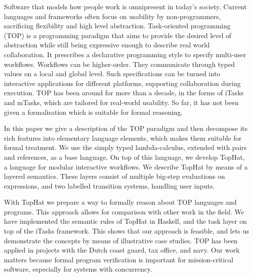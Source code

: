 
Software that models how people work is omnipresent in today's society.
Current languages and frameworks often focus on usability by non-programmers, sacrificing flexibility and high level abstraction.
Task-oriented programming (TOP) is a programming paradigm that aims to provide the desired level of abstraction while still being expressive enough to describe real world collaboration.
It prescribes a declarative programming style to specify multi-user workflows.
Workflows can be higher-order.
They communicate through typed values on a local and global level.
Such specifications can be turned into interactive applications for different platforms, supporting collaboration during execution.
TOP has been around for more than a decade, in the forms of iTasks and mTasks, which are tailored for real-world usability.
So far, it has not been given a formalisation which is suitable for formal reasoning.

In this paper we give a description of the TOP paradigm and then decompose its rich features into elementary language elements, which makes them suitable for formal treatment.
We use the simply typed lambda-calculus, extended with pairs and references, as a base language.
On top of this language, we develop TopHat, a language for modular interactive workflows.
We describe TopHat by means of a layered semantics.
These layers consist of multiple big-step evaluations on expressions, and two labelled transition systems, handling user inputs.

With TopHat we prepare a way to formally reason about TOP languages and programs.
This approach allows for comparison with other work in the field.
We have implemented the semantic rules of TopHat in Haskell, and the task layer on top of the iTasks framework.
This shows that our approach is feasible, and lets us demonstrate the concepts by means of illustrative case studies.
TOP has been applied in projects with the Dutch coast guard, tax office, and navy.
Our work matters because formal program verification is important for mission-critical software, especially for systems with concurrency.



